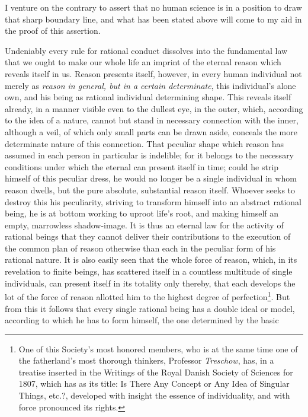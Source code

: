 \documentclass[12pt,a4paper,openany]{book}
\newcommand{\opage}[1]{\marginnote{\footnotesize\textit{[#1]}}}
\begin{document}
I venture on the contrary to assert that no human science is in a position to draw
that sharp boundary line, and what has been stated above will come to my aid in the
proof of this assertion.

Undeniably every rule for rational conduct dissolves into the fundamental law that
we ought to make our whole life an imprint of the eternal reason which reveals
itself in us. Reason presents itself, however, in every human individual not merely
as \emph{reason in general, but in a certain determinate}, this individual's
alone own, and his being as rational individual determining shape. This reveals
itself already, in a manner visible even to the dullest eye, in the outer, which,
according to the idea of a nature, cannot but stand in necessary connection with the
inner, although a veil, of which only small parts can be
\setcounter{footnote}{0}%
\opage{84}drawn aside, conceals the more determinate nature of this connection. That
peculiar shape which reason has assumed in each person in particular is indelible;
for it belongs to the necessary conditions under which the eternal can present
itself in time; could he strip himself of this peculiar dress, he would no longer be
a single individual in whom reason dwells, but the pure absolute, substantial reason
itself. Whoever seeks to destroy this his peculiarity, striving to transform himself
into an abstract rational being, he is at bottom working to uproot
life's root, and making himself an empty, marrowless shadow-image. It is thus an
eternal law for the activity of rational beings that they cannot deliver their
contributions to the execution of the common plan of reason otherwise than each in
the peculiar form of his rational nature. It is also easily seen that the whole
force of reason, which, in its revelation to finite beings, has scattered itself in
a countless multitude of single individuals, can present itself in its totality only
thereby, that each develops the lot of the force of reason allotted him to the
highest degree of perfection\footnote[1]{One of this Society's most honored members, who is at the same time one of the fatherland's most thorough thinkers, Professor \emph{Treschow}, has, in a treatise inserted in the Writings of the Royal Danish Society of Sciences for 1807, which has as its title: Is There Any Concept or Any Idea of Singular Things, etc.?, developed with insight the essence of individuality, and with force pronounced its rights.}.
But from this it follows that every single rational being has a double ideal or
model, according to which he has to form himself, the one determined by the basic
\end{document}
